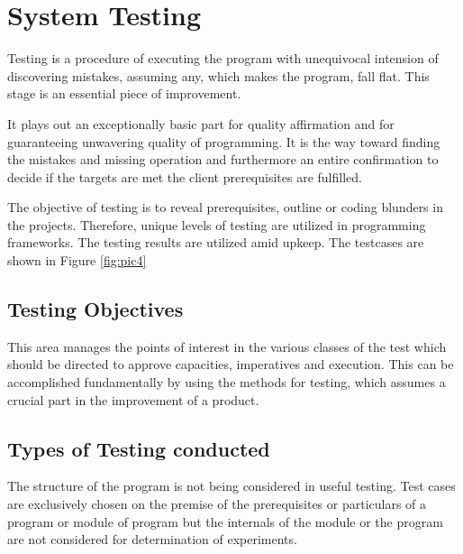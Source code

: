 \documentclass[12pt,a4paper]{report}
\begin{document}
\chapter{System Testing}
\par
Testing is a procedure of executing the program with unequivocal intension of \cite{ref4}
discovering mistakes, assuming any, which makes the program, fall flat. This stage is an
essential piece of improvement.
\par
It plays out an exceptionally basic part for quality affirmation and for guaranteeing
unwavering quality of programming. It is the way toward finding the mistakes and
missing operation and furthermore an entire confirmation to decide if the targets are met
the client prerequisites are fulfilled.
\par
The objective of testing is to reveal prerequisites, outline or coding blunders in the
projects. Therefore, unique levels of testing are utilized in programming frameworks. The
testing results are utilized amid upkeep. The testcases are shown in Figure \ref{fig:pic4}

\section{Testing Objectives}
This area manages the points of interest in the various classes of the test which should be
directed to approve capacities, imperatives and execution. This can be accomplished
fundamentally by using the methods for testing, which assumes a crucial part in the
improvement of a product.

\section{Types of Testing conducted}
The structure of the program is not being considered in useful testing. Test cases are
exclusively chosen on the premise of the prerequisites or particulars of a program or
module of program but the internals of the module or the program are not considered for
determination of experiments\cite{ref1}.
\end{document}
